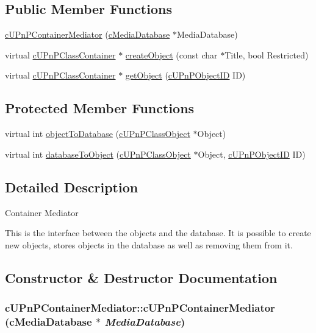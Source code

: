 \subsection*{Public Member Functions}
\begin{CompactItemize}
\item 
\hyperlink{classcUPnPContainerMediator_e6fce4835ea40a77b401a093f65b5822}{cUPnPContainerMediator} (\hyperlink{classcMediaDatabase}{cMediaDatabase} $\ast$MediaDatabase)
\item 
virtual \hyperlink{classcUPnPClassContainer}{cUPnPClassContainer} $\ast$ \hyperlink{classcUPnPContainerMediator_751177c725da94b1b91f6cda4645844d}{createObject} (const char $\ast$Title, bool Restricted)
\item 
virtual \hyperlink{classcUPnPClassContainer}{cUPnPClassContainer} $\ast$ \hyperlink{classcUPnPContainerMediator_78b71f96fb4289dc78f897d6282078d6}{getObject} (\hyperlink{structcUPnPObjectID}{cUPnPObjectID} ID)
\end{CompactItemize}
\subsection*{Protected Member Functions}
\begin{CompactItemize}
\item 
virtual int \hyperlink{classcUPnPContainerMediator_1caa4625fca42940ba36999a71ac49ec}{objectToDatabase} (\hyperlink{classcUPnPClassObject}{cUPnPClassObject} $\ast$Object)
\item 
virtual int \hyperlink{classcUPnPContainerMediator_79f483b48f596047ed9549f0b036f35b}{databaseToObject} (\hyperlink{classcUPnPClassObject}{cUPnPClassObject} $\ast$Object, \hyperlink{structcUPnPObjectID}{cUPnPObjectID} ID)
\end{CompactItemize}


\subsection{Detailed Description}
Container Mediator

This is the interface between the objects and the database. It is possible to create new objects, stores objects in the database as well as removing them from it. 

\subsection{Constructor \& Destructor Documentation}
\hypertarget{classcUPnPContainerMediator_e6fce4835ea40a77b401a093f65b5822}{
\subsubsection[{cUPnPContainerMediator}]{\setlength{\rightskip}{0pt plus 5cm}cUPnPContainerMediator::cUPnPContainerMediator ({\bf cMediaDatabase} $\ast$ {\em MediaDatabase})}}
\label{classcUPnPContainerMediator_e6fce4835ea40a77b401a093f65b5822}


